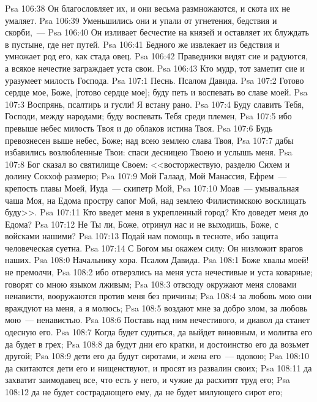 \vs Psa 106:38 Он благословляет их, и они весьма размножаются, и скота их не умаляет.
\vs Psa 106:39 Уменьшились они и упали от угнетения, бедствия и скорби,~---
\vs Psa 106:40 Он изливает бесчестие на князей и оставляет их блуждать в пустыне, где нет путей.
\vs Psa 106:41 Бедного же извлекает из бедствия и умножает род его, как стада овец.
\vs Psa 106:42 Праведники видят сие и радуются, а всякое нечестие заграждает уста свои.
\vs Psa 106:43 Кто мудр, тот заметит сие и уразумеет милость Господа.
\vs Psa 107:1 Песнь. Псалом Давида.
\rsbpar\vs Psa 107:2 Готово сердце мое, Боже, [готово сердце мое]; буду петь и воспевать во славе моей.
\vs Psa 107:3 Воспрянь, псалтирь и гусли! Я встану рано.
\vs Psa 107:4 Буду славить Тебя, Господи, между народами; буду воспевать Тебя среди племен,
\vs Psa 107:5 ибо превыше небес милость Твоя и до облаков истина Твоя.
\vs Psa 107:6 Будь превознесен выше небес, Боже; над всею землею  слава Твоя,
\vs Psa 107:7 дабы избавились возлюбленные Твои: спаси десницею Твоею и услышь меня.
\vs Psa 107:8 Бог сказал во святилище Своем: <<восторжествую, разделю Сихем и долину Сокхоф размерю;
\vs Psa 107:9 Мой Галаад, Мой Манассия, Ефрем~--- крепость главы Моей, Иуда~--- скипетр Мой,
\vs Psa 107:10 Моав~--- умывальная чаша Моя, на Едома простру сапог Мой, над землею Филистимскою восклицать буду>>.
\vs Psa 107:11 Кто введет меня в укрепленный город? Кто доведет меня до Едома?
\vs Psa 107:12 Не Ты ли, Боже,  отринул нас и не выходишь, Боже, с войсками нашими?
\vs Psa 107:13 Подай нам помощь в тесноте, ибо защита человеческая суетна.
\vs Psa 107:14 С Богом мы окажем силу: Он низложит врагов наших.
\vs Psa 108:0 Начальнику хора. Псалом Давида.
\rsbpar\vs Psa 108:1 Боже хвалы моей! не премолчи,
\vs Psa 108:2 ибо отверзлись на меня уста нечестивые и уста коварные; говорят со мною языком лживым;
\vs Psa 108:3 отвсюду окружают меня словами ненависти, вооружаются против меня без причины;
\vs Psa 108:4 за любовь мою они враждуют на меня, а я молюсь;
\vs Psa 108:5 воздают мне за добро злом, за любовь мою~--- ненавистью.
\vs Psa 108:6 Поставь над ним нечестивого, и диавол да станет одесную его.
\vs Psa 108:7 Когда будет судиться, да выйдет виновным, и молитва его да будет в грех;
\vs Psa 108:8 да будут дни его кратки, и достоинство его да возьмет другой;
\vs Psa 108:9 дети его да будут сиротами, и жена его~--- вдовою;
\vs Psa 108:10 да скитаются дети его и нищенствуют, и просят  из развалин своих;
\vs Psa 108:11 да захватит заимодавец все, что есть у него, и чужие да расхитят труд его;
\vs Psa 108:12 да не будет сострадающего ему, да не будет милующего сирот его;
